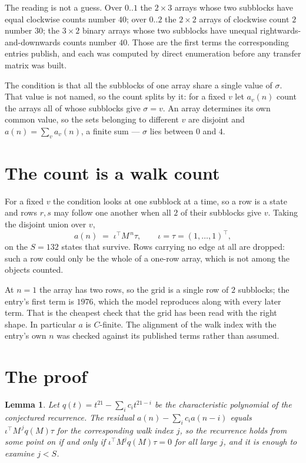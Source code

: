 \documentclass[11pt,a4paper]{article}
\theoremstyle{plain}
\newtheorem{lemma}[theorem]{Lemma}
\theoremstyle{definition}
\begin{document}
The reading is not a guess. Over $0..1$ the $2\times3$ arrays whose two subblocks have equal
clockwise counts number $40$; over $0..2$ the $2\times2$ arrays of clockwise count $2$ number
$30$; the $3\times2$ binary arrays whose two subblocks have unequal rightwards-and-downwards
counts number $40$. Those are the first terms the corresponding entries publish, and each was
computed by direct enumeration before any transfer matrix was built.

The condition is that all the subblocks of one array share a single value of $\sigma$. That
value is not named, so the count splits by it: for a fixed $v$ let $a_v(n)$ count the arrays all
of whose subblocks give $\sigma=v$. An array determines its own common value, so the sets
belonging to different $v$ are disjoint and $a(n)=\sum_v a_v(n)$, a finite sum --- $\sigma$
lies between $0$ and $4$.

\section{The count is a walk count}

For a fixed $v$ the condition looks at one subblock at a time, so a row is
a state and rows $r,s$ may follow one another when all $2$ of their subblocks give $v$.
Taking the disjoint union over $v$,
\[
a(n)\;=\;\iota^{\!\top}M^{\,n}\tau,\qquad\iota=\tau=(1,\dots,1)^{\!\top},
\]
on the $S=132$ states that survive. Rows carrying no edge at all are dropped: such a row could
only be the whole of a one-row array, which is not among the objects counted.

At $n=1$ the array has two rows, so the grid is a single row of $2$
subblocks; the entry's first term is $1976$, which the model
reproduces along with every later term. That is the cheapest check that the grid has been read
with the right shape.
In particular $a$ is $C$-finite. The alignment of the walk index with the entry's own $n$ was
checked against its published terms rather than assumed.

\section{The proof}

\begin{lemma}\label{lem:crit}
Let $q(t)=t^{21}-\sum_i c_it^{21-i}$ be the characteristic polynomial of the
conjectured recurrence. The residual $a(n)-\sum_ic_ia(n-i)$ equals
$\iota^{\!\top}M^{\,j}q(M)\tau$ for the corresponding walk index $j$, so the recurrence
holds from some point on if and only if $\iota^{\!\top}M^{j}q(M)\tau=0$ for all large $j$,
and it is enough to examine $j<S$.
\end{lemma}
\end{document}
